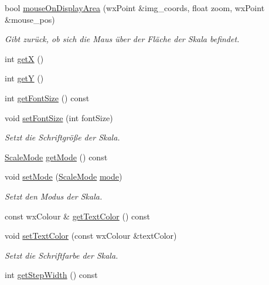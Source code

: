 \begin{DoxyCompactItemize}
bool \hyperlink{classGUIColorScalePanel_a4b17b0a63d3921ce09ffe5a99b6955a5}{mouse\-On\-Display\-Area} (wx\-Point \&img\-\_\-coords, float zoom, wx\-Point \&mouse\-\_\-pos)
\begin{DoxyCompactList}\small\item\em Gibt zurück, ob sich die Maus über der Fläche der Skala befindet. \end{DoxyCompactList}\item 
int \hyperlink{classGUIColorScalePanel_a8f5da4bc81c7ef878214cd5d0a0b2c19}{get\-X} ()
\item 
int \hyperlink{classGUIColorScalePanel_a5eff7202dade14031b7bf45f305f54e4}{get\-Y} ()
\item 
int \hyperlink{classGUIColorScalePanel_a3569b14af591835eeb60b2aa9c672ca4}{get\-Font\-Size} () const 
\item 
void \hyperlink{classGUIColorScalePanel_ae26f3f500092717aa7e9a85126b38461}{set\-Font\-Size} (int font\-Size)
\begin{DoxyCompactList}\small\item\em Setzt die Schriftgröße der Skala. \end{DoxyCompactList}\item 
\hyperlink{classGUIColorScalePanel_a56a63e898188b90b82295ff7c3ebc265}{Scale\-Mode} \hyperlink{classGUIColorScalePanel_a4af2d1c1f161f42e2d6573315caec82f}{get\-Mode} () const 
\item 
void \hyperlink{classGUIColorScalePanel_aba2363ced766a14d72ad5448502f62a4}{set\-Mode} (\hyperlink{classGUIColorScalePanel_a56a63e898188b90b82295ff7c3ebc265}{Scale\-Mode} \hyperlink{classGUIColorScalePanel_ad2f795e0d3a1c8e731da16d3320dbd34}{mode})
\begin{DoxyCompactList}\small\item\em Setzt den Modus der Skala. \end{DoxyCompactList}\item 
const wx\-Colour \& \hyperlink{classGUIColorScalePanel_aae51a1ecdb5bfca126c36ad169fce846}{get\-Text\-Color} () const 
\item 
void \hyperlink{classGUIColorScalePanel_ad9056636be2c0707127225484f0d0392}{set\-Text\-Color} (const wx\-Colour \&text\-Color)
\begin{DoxyCompactList}\small\item\em Setzt die Schriftfarbe der Skala. \end{DoxyCompactList}\item 
int \hyperlink{classGUIColorScalePanel_a5b69bf4853de97fa2445721165cab206}{get\-Step\-Width} () const 

\end{DoxyCompactItemize}
